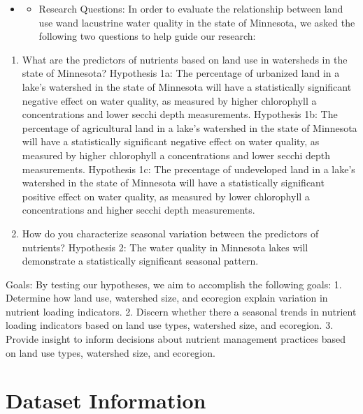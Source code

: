 \documentclass[12pt,]{article}
\providecommand{\tightlist}{%
  \setlength{\itemsep}{0pt}\setlength{\parskip}{0pt}}
\begin{document}
\begin{itemize}
\item
  \begin{itemize}
  \tightlist
  \item
    Research Questions: In order to evaluate the relationship between
    land use wand lacustrine water quality in the state of Minnesota, we
    asked the following two questions to help guide our research:
  \end{itemize}
\end{itemize}

\begin{enumerate}
\def\labelenumi{\arabic{enumi}.}
\tightlist
\item
  What are the predictors of nutrients based on land use in watersheds
  in the state of Minnesota? Hypothesis 1a: The percentage of urbanized
  land in a lake's watershed in the state of Minnesota will have a
  statistically significant negative effect on water quality, as
  measured by higher chlorophyll a concentrations and lower secchi depth
  measurements. Hypothesis 1b: The percentage of agricultural land in a
  lake's watershed in the state of Minnesota will have a statistically
  significant negative effect on water quality, as measured by higher
  chlorophyll a concentrations and lower secchi depth measurements.
  Hypothesis 1c: The precentage of undeveloped land in a lake's
  watershed in the state of Minnesota will have a statistically
  significant positive effect on water quality, as measured by lower
  chlorophyll a concentrations and higher secchi depth measurements.
\item
  How do you characterize seasonal variation between the predictors of
  nutrients? Hypothesis 2: The water quality in Minnesota lakes will
  demonstrate a statistically significant seasonal pattern.
\end{enumerate}

Goals: By testing our hypotheses, we aim to accomplish the following
goals: 1. Determine how land use, watershed size, and ecoregion explain
variation in nutrient loading indicators. 2. Discern whether there a
seasonal trends in nutrient loading indicators based on land use types,
watershed size, and ecoregion. 3. Provide insight to inform decisions
about nutrient management practices based on land use types, watershed
size, and ecoregion.

\newpage

\hypertarget{dataset-information}{%
\section{Dataset Information}\label{dataset-information}}
\end{document}
